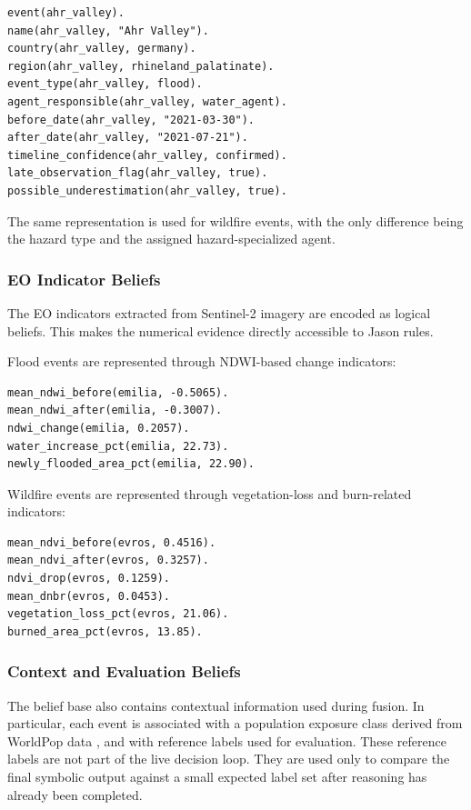 \documentclass[11pt,a4paper]{article}
\begin{document}
\begin{lstlisting}
event(ahr_valley).
name(ahr_valley, "Ahr Valley").
country(ahr_valley, germany).
region(ahr_valley, rhineland_palatinate).
event_type(ahr_valley, flood).
agent_responsible(ahr_valley, water_agent).
before_date(ahr_valley, "2021-03-30").
after_date(ahr_valley, "2021-07-21").
timeline_confidence(ahr_valley, confirmed).
late_observation_flag(ahr_valley, true).
possible_underestimation(ahr_valley, true).
\end{lstlisting}

The same representation is used for wildfire events, with the only difference being the hazard type and the assigned hazard-specialized agent.

\subsubsection{EO Indicator Beliefs}

The EO indicators extracted from Sentinel-2 imagery are encoded as logical beliefs. This makes the numerical evidence directly accessible to Jason rules.

Flood events are represented through NDWI-based change indicators:

\begin{lstlisting}
mean_ndwi_before(emilia, -0.5065).
mean_ndwi_after(emilia, -0.3007).
ndwi_change(emilia, 0.2057).
water_increase_pct(emilia, 22.73).
newly_flooded_area_pct(emilia, 22.90).
\end{lstlisting}

Wildfire events are represented through vegetation-loss and burn-related indicators:

\begin{lstlisting}
mean_ndvi_before(evros, 0.4516).
mean_ndvi_after(evros, 0.3257).
ndvi_drop(evros, 0.1259).
mean_dnbr(evros, 0.0453).
vegetation_loss_pct(evros, 21.06).
burned_area_pct(evros, 13.85).
\end{lstlisting}

\subsubsection{Context and Evaluation Beliefs}

The belief base also contains contextual information used during fusion. In particular, each event is associated with a population exposure class derived from WorldPop data \cite{worldpop2025}, and with reference labels used for evaluation. These reference labels are not part of the live decision loop. They are used only to compare the final symbolic output against a small expected label set after reasoning has already been completed.
\end{document}
